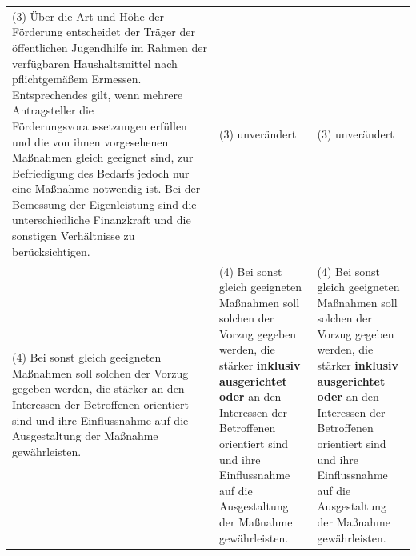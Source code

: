 \documentclass[10pt,a4paper,landscape]{article}
\begin{document}
\begin{longtable}{|L{8.2cm}|L{8.2cm}|L{8.2cm}|}
(3) Über die Art und Höhe der Förderung  \newline entscheidet der Träger der öffentlichen  \newline Jugendhilfe im Rahmen der verfügbaren  \newline Haushaltsmittel nach pflichtgemäßem  \newline Ermessen. Entsprechendes gilt, wenn  \newline mehrere Antragsteller die  \newline Förderungsvoraussetzungen erfüllen und  \newline die von ihnen vorgesehenen Maßnahmen  \newline gleich geeignet sind, zur Befriedigung des  \newline Bedarfs jedoch nur eine Maßnahme  \newline notwendig ist. Bei der Bemessung der  \newline Eigenleistung sind die unterschiedliche  \newline Finanzkraft und die sonstigen Verhältnisse  \newline zu berücksichtigen. & (3) unverändert & (3) unverändert \\
\hhline{|---|}
(4) Bei sonst gleich geeigneten  \newline Maßnahmen soll solchen der Vorzug  \newline gegeben werden, die stärker an den  \newline Interessen der Betroffenen orientiert sind  \newline und ihre Einflussnahme auf die  \newline Ausgestaltung der Maßnahme  \newline gewährleisten. & (4) Bei sonst gleich geeigneten  \newline Maßnahmen soll solchen der Vorzug  \newline gegeben werden, die stärker \textbf{inklusiv  \newline ausgerichtet oder }an den Interessen der  \newline Betroffenen orientiert sind und ihre  \newline Einflussnahme auf die Ausgestaltung der  \newline Maßnahme gewährleisten. & (4) Bei sonst gleich geeigneten  \newline Maßnahmen soll solchen der Vorzug  \newline gegeben werden, die stärker \textbf{inklusiv  \newline ausgerichtet oder }an den Interessen der  \newline Betroffenen orientiert sind und ihre  Einflussnahme auf die Ausgestaltung der  \newline Maßnahme gewährleisten. \\

\end{longtable}
\end{document}

